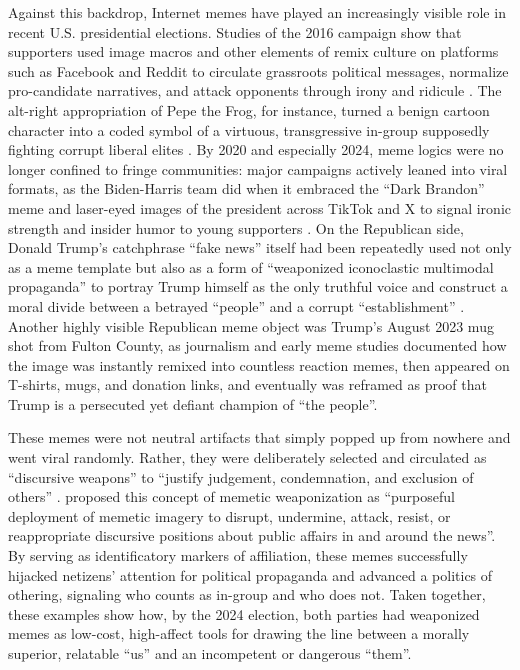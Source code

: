 \documentclass[12pt,twoside]{article}
\begin{document}
Against this backdrop, Internet memes have played an increasingly visible role in recent U.S. presidential elections. Studies of the 2016 campaign show that supporters used image macros and other elements of remix culture on platforms such as Facebook and Reddit to circulate grassroots political messages, normalize pro-candidate narratives, and attack opponents through irony and ridicule \parencite{hunting2020popularmediamemes, moodyramirez2019facebookmemegroups}. The alt-right appropriation of Pepe the Frog, for instance, turned a benign cartoon character into a coded symbol of a virtuous, transgressive in-group supposedly fighting corrupt liberal elites \parencite{glitsos2020pepememeDarwinianAbsurd}. By 2020 and especially 2024, meme logics were no longer confined to fringe communities: major campaigns actively leaned into viral formats, as the Biden-Harris team did when it embraced the ``Dark Brandon'' meme and laser-eyed images of the president across TikTok and X to signal ironic strength and insider humor to young supporters \parencite{robertson2024bidenmemelord,mielczarek2024darkbrandonenthymeme}. On the Republican side, Donald Trump's catchphrase ``fake news'' itself had been repeatedly used not only as a meme template but also as a form of ``weaponized iconoclastic multimodal propaganda'' \parencite{smith2019weaponizediconoclasm} to portray Trump himself as the only truthful voice and construct a moral divide between a betrayed ``people'' and a corrupt ``establishment'' \parencite{ross2018discursivedeflection,woodward2020fakenewsguide}. Another highly visible Republican meme object was Trump's August 2023 mug shot from Fulton County, as journalism \parencite{yang2023mugshottomugs} and early meme studies \parencite{meleshchenko2024multimodalmetaphtonymy} documented how the image was instantly remixed into countless reaction memes, then appeared on T-shirts, mugs, and donation links, and eventually was reframed as proof that Trump is a persecuted yet defiant champion of ``the people''.

These memes were not neutral artifacts that simply popped up from nowhere and went viral randomly. Rather, they were deliberately selected and circulated as ``discursive weapons'' to ``justify judgement, condemnation, and exclusion of others'' \parencite[495]{nissenbaum2017contestedculturalcapital}. \textcite{peters2021weaponizingmemes} proposed this concept of memetic weaponization as ``purposeful deployment of memetic imagery to disrupt, undermine, attack, resist, or reappropriate discursive positions about public affairs in and around the news''. By serving as identificatory markers of affiliation, these memes successfully hijacked netizens' attention for political propaganda \parencite{olsen2018weaponizedmemes} and advanced a politics of othering, signaling who counts as in-group and who does not.
Taken together, these examples show how, by the 2024 election, both parties had weaponized memes as low-cost, high-affect tools for drawing the line between a morally superior, relatable ``us'' and an incompetent or dangerous ``them''. 
\end{document}
